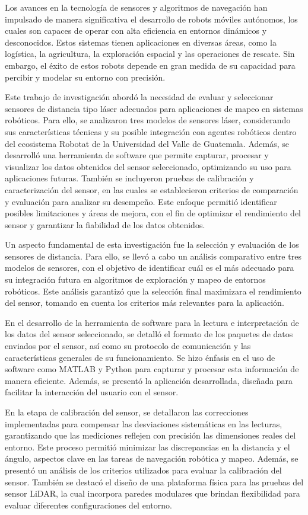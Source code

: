 Los avances en la tecnología de sensores y algoritmos de navegación han impulsado de manera significativa el desarrollo de robots móviles autónomos, los cuales son capaces de operar con alta eficiencia en entornos dinámicos y desconocidos. Estos sistemas tienen aplicaciones en diversas áreas, como la logística, la agricultura, la exploración espacial y las operaciones de rescate. Sin embargo, el éxito de estos robots depende en gran medida de su capacidad para percibir y modelar su entorno con precisión.

Este trabajo de investigación abordó la necesidad de evaluar y seleccionar sensores de distancia tipo láser adecuados para aplicaciones de mapeo en sistemas robóticos. Para ello, se analizaron tres modelos de sensores láser, considerando sus características técnicas y su posible integración con agentes robóticos dentro del ecosistema Robotat de la Universidad del Valle de Guatemala. Además, se desarrolló una herramienta de software que permite capturar, procesar y visualizar los datos obtenidos del sensor seleccionado, optimizando su uso para aplicaciones futuras. También se incluyeron pruebas de calibración y caracterización del sensor, en las cuales se establecieron criterios de comparación y evaluación para analizar su desempeño. Este enfoque permitió identificar posibles limitaciones y áreas de mejora, con el fin de optimizar el rendimiento del sensor y garantizar la fiabilidad de los datos obtenidos.

Un aspecto fundamental de esta investigación fue la selección y evaluación de los sensores de distancia. Para ello, se llevó a cabo un análisis comparativo entre tres modelos de sensores, con el objetivo de identificar cuál es el más adecuado para su integración futura en algoritmos de exploración y mapeo de entornos robóticos. Este análisis garantizó que la selección final maximizara el rendimiento del sensor, tomando en cuenta los criterios más relevantes para la aplicación.

En el desarrollo de la herramienta de software para la lectura e interpretación de los datos del sensor seleccionado, se detalló el formato de los paquetes de datos enviados por el sensor, así como su protocolo de comunicación y las características generales de su funcionamiento. Se hizo énfasis en el uso de software como MATLAB y Python para capturar y procesar esta información de manera eficiente. Además, se presentó la aplicación desarrollada, diseñada para facilitar la interacción del usuario con el sensor.

En la etapa de calibración del sensor, se detallaron las correcciones implementadas para compensar las desviaciones sistemáticas en las lecturas, garantizando que las mediciones reflejen con precisión las dimensiones reales del entorno. Este proceso permitió minimizar las discrepancias en la distancia y el ángulo, aspectos clave en las tareas de navegación robótica y mapeo. Además, se presentó un análisis de los criterios utilizados para evaluar la calibración del sensor. También se destacó el diseño de una plataforma física para las pruebas del sensor LiDAR, la cual incorpora paredes modulares que brindan flexibilidad para evaluar diferentes configuraciones del entorno.

